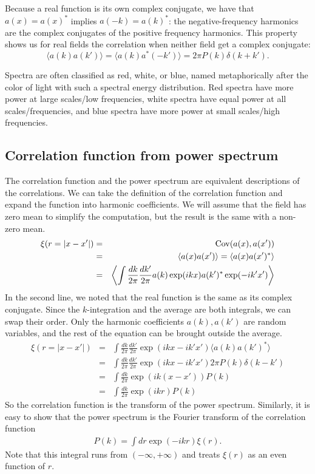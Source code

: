 Because a real function is its own complex conjugate, we have that $a(x)=a(x)^*$ implies $a(-k) = a(k)^*$: the negative-frequency harmonics are the complex conjugates of the positive frequency harmonics. This property shows us for real fields the correlation when neither field get a complex conjugate:
\begin{equation}
  \langle a(k) a(k') \rangle = \langle a(k) a^*(-k') \rangle = 2\pi P(k) \delta(k + k').
\end{equation}


Spectra are often classified as red, white, or blue, named metaphorically after the color of light with such a spectral energy distribution.  Red spectra have more power at large scales/low frequencies, white spectra have equal power at all scales/frequencies, and blue spectra have more power at small scales/high frequencies.

\subsection{Correlation function from power spectrum}
The correlation function and the power spectrum are equivalent descriptions of the correlations.  
We can take the definition of the correlation function and expand the function into harmonic coefficients.  We will assume that the field has zero mean to simplify the computation, but the result is the same with a non-zero mean.
\begin{eqnarray}
  \xi ( r = |x - x'| ) &=& {\rm Cov}(a(x),a(x')) \nonumber \\
  & = & \langle a(x) a(x') \rangle = \langle a(x) a(x')^* \rangle \nonumber \\
  & = &  \left\langle \int \frac{dk}{2\pi} \frac{dk'}{2\pi}  a(k)\exp(ikx) a(k')^* \exp(-ik'x') \right\rangle
\end{eqnarray}
In the second line, we noted that the real function is the same as its complex conjugate.  Since the $k$-integration and the average are both integrals, we can swap their order.  Only the harmonic coefficients $a(k), a(k')$ are random variables, and the rest of the equation can be brought outside the average.
\begin{eqnarray}
  \xi ( r = |x - x'| ) &=& \int \frac{dk}{2\pi} \frac{dk'}{2\pi} \exp(ikx-ik'x') \langle  a(k)a(k')^* \rangle \nonumber \\
  &=& \int \frac{dk}{2\pi} \frac{dk'}{2\pi} \exp(ikx-ik'x') 2\pi P(k) \delta(k-k') \nonumber \\
  &=& \int \frac{dk}{2\pi}  \exp(ik(x-x')) P(k) \nonumber \\
  &=& \int \frac{dk}{2\pi}  \exp(ikr) P(k) \label{eq:xi_from_P}
\end{eqnarray}
So the correlation function is the transform of the power spectrum.  Similarly, it is easy to show that the power spectrum is the Fourier transform of the correlation function
\begin{eqnarray}
  P(k) = \int dr \exp(-ikr) \xi(r). \label{eqn:P(k)_from_xi(r)}
\end{eqnarray}
Note that this integral runs from $(-\infty,+\infty)$ and treats $\xi(r)$ as an even function of $r$.

